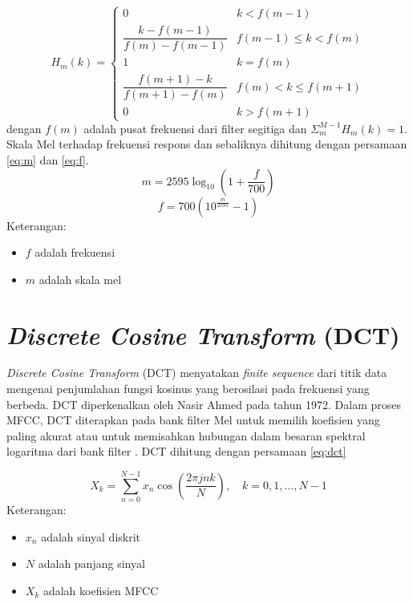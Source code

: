     \begin{equation}
        H_m(k) = 
        \begin{cases} 
            0 & k < f(m-1) \\ 
            \dfrac{k - f(m-1)}{f(m) - f(m-1)} & f(m-1) \leq k < f(m) \\ 
            1 & k = f(m) \\ 
            \dfrac{f(m+1) - k}{f(m+1) - f(m)} & f(m) < k \leq f(m+1) \\ 
            0 & k > f(m+1) 
        \end{cases}
    \label{eq:mel_filter_bank}
    \end{equation}
    dengan $f(m)$ adalah pusat frekuensi dari filter segitiga dan $\Sigma_{m}^{M-1}H_m(k)=1$.
    Skala Mel terhadap frekuensi respons dan sebaliknya dihitung dengan persamaan \ref{eq:m} dan \ref{eq:f}.
    \begin{equation}
        m = 2595 \log_{10} \left( 1 + \frac{f}{700} \right)
    \label{eq:m}
    \end{equation}
    \begin{equation}
        f = 700 \left( 10^{\frac{m}{2595}} - 1 \right)
    \label{eq:f}
    \end{equation}
    Keterangan:
\begin{itemize}
    \item $f$ adalah frekuensi
    \item $m$ adalah skala mel
\end{itemize}
    \section{\textit{Discrete Cosine Transform} (DCT)}
    \textit{Discrete Cosine Transform} (DCT) menyatakan \textit{finite sequence} dari titik data mengenai penjumlahan fungsi kosinus yang berosilasi pada frekuensi yang berbeda. DCT diperkenalkan oleh Nasir Ahmed pada tahun 1972. Dalam proses MFCC, DCT diterapkan pada bank filter Mel untuk memilih koefisien yang paling akurat atau untuk memisahkan hubungan dalam besaran spektral logaritma dari bank filter \cite{strang1999discrete}. DCT dihitung dengan persamaan \ref{eq:dct}

    \begin{equation}
        X_k = \sum_{n=0}^{N-1} x_n \cos\left(\frac{2\pi jnk}{N}\right), \quad k = 0, 1, \ldots, N-1
    \label{eq:dct}
    \end{equation}
    Keterangan:
\begin{itemize}
    \item $x_n$ adalah sinyal diskrit
    \item $N$ adalah panjang sinyal
    \item $X_k$ adalah koefisien MFCC
\end{itemize}

